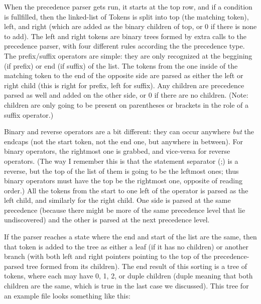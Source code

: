 \documentclass{article}
\newcommand{\todo}[1]{}
\begin{document}
When the precedence parser gets run, it starts at the top row, and if a condition is fullfilled, then the linked-list of Tokens is split into top (the matching token), left, and right (which are added as the binary children of top, or 0 if there is none to add).  The left and right tokens are binary trees formed by extra calls to the precedence parser, with four different rules according the the precedence type.  The prefix/suffix operators are simple: they are only recognized at the beggining (if prefix) or end (if suffix) of the list.  The tokens from the one inside of the matching token to the end of the opposite side are parsed as either the left or right child (this is right for prefix, left for suffix).  Any children are precedence parsed as well and added on the other side, or 0 if there are no children. (Note: children are only going to be present on parentheses or brackets in the role of a suffix operator.)

Binary and reverse operators are a bit different: they can occur anywhere \emph{but} the endcaps (not the start token, not the end one, but anywhere in between).  For binary operators, the rightmost one is grabbed, and vice-versa for reverse operators.  (The way I remember this is that the statement separator (;) is a reverse, but the top of the list of them is going to be the leftmost ones; thus binary operators must have the top be the rightmost one, opposite of reading order.)  All the tokens from the start to one left of the operator is parsed as the left child, and similarly for the right child.  One side is parsed at the same precedence (because there might be more of the same precedence level that lie undiscovered) and the other is parsed at the next precedence level.

If the parser reaches a state where the end and start of the list are the same, then that token is added to the tree as either a leaf (if it has no children) or another branch (with both left and right pointers pointing to the top of the precedence-parsed tree formed from its children).  The end result of this sorting is a tree of tokens, where each may have 0, 1, 2, or duple children (duple meaning that both children are the same, which is true in the last case we discussed).  This tree for an example file looks something like this:

\todo{ this should probably be a new tex function to create parse trees for Nasal expressions and visualize them accordingly, i.e. enable parser debugging to get a console dump (WIP!) }
\end{document}
